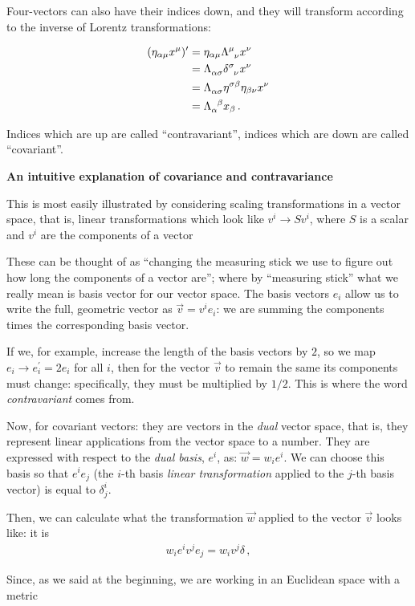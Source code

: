 \documentclass[main.tex]{subfiles}
\begin{document}
Four-vectors can also have their indices down, and they will transform according to the inverse of Lorentz transformations:
  
\begin{subequations}
\begin{align}
(\eta_{\alpha\mu} x^\mu)' &=  \eta_{\alpha \mu} \tensor{\Lambda}{^\mu_\nu}x^\nu  \\
&= \tensor{\Lambda}{_\alpha_\sigma} \tensor{\delta}{^\sigma_\nu} x^\nu  \\
&= \tensor{\Lambda}{_\alpha_\sigma} \eta^{\sigma \beta} \eta_{\beta \nu} x^\nu  \\
&= \tensor{\Lambda}{_\alpha^\beta} x_\beta\,.
\end{align}
\end{subequations}

Indices which are up are called ``contravariant'', indices which are down are called ``covariant''.

\begin{bluebox}
\textbf{An intuitive explanation of covariance and contravariance}

This is most easily illustrated by considering scaling transformations in a vector space, that is, linear transformations which look like \(v^{i} \rightarrow S v^{i}\), where \(S\) is a scalar and \(v^{i}\) are the components of a vector

These can be thought of as ``changing the measuring stick we use to figure out how long the components of a vector are''; where by ``measuring stick'' what we really mean is basis vector for our vector space.
The basis vectors \(e_{i}\) allow us to write the full, geometric vector as \(\vec{v} = v^{i} e_{i}\): we are summing the components times the corresponding basis vector.

If we, for example, increase the length of the basis vectors by \(2\), so we map \(e_{i} \rightarrow e_{i}^{\prime } = 2 e_{i}\) for all \(i\), then for the vector \(\vec{v}\) to remain the same its components must change: specifically, they must be multiplied by \(1/2\). 
This is where the word \emph{contravariant} comes from. 

Now, for covariant vectors: they are vectors in the \emph{dual} vector space, that is, they represent linear applications from the vector space to a number. They are expressed with respect to the \emph{dual basis}, \(e^{i}\), as: \(\vec{w} = w_{i} e^{i}\).
We can choose this basis so that \(e^{i} e_{j}\) (the \(i\)-th basis \emph{linear transformation} applied to the \(j\)-th basis vector) is equal to \(\delta^{i}_{j}\).

Then, we can calculate what the transformation \(\vec{w}\) applied to the vector \(\vec{v}\) looks like: it is 
%
\begin{align}
w_{i} e^{i} v^{j} e_{j} = w_{i} v^{j} \delta 
\,,
\end{align}
%


Since, as we said at the beginning, we are working in an Euclidean space with a metric
\end{bluebox}
\end{document}
